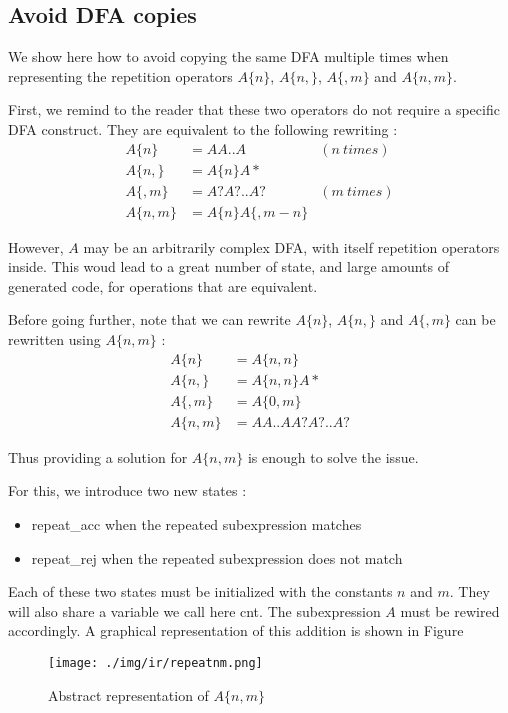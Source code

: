 \documentclass[11pt,a4paper]{report}
\newcommand{\regexp}[1]{$#1$}
\newcommand{\haskell}[1]{\textsf{#1}}
\begin{document}
\subsection{Avoid DFA copies}

We show here how to avoid copying the same DFA multiple times when representing the repetition operators \regexp{A\{n\}}, \regexp{A\{n,\}}, \regexp{A\{,m\}} and \regexp{A\{n,m\}}.

First, we remind to the reader that these two operators do not require a specific DFA construct. They are equivalent to the following rewriting :
\begin{align*}
A\{n\} &= AA..A &(n\ times) \\
A\{n,\} &= A\{n\}A*  \\
A\{,m\} &= A?A?..A? &(m\ times) \\
A\{n,m\} &= A\{n\}A\{,m-n\}
\end{align*}

However, $A$ may be an arbitrarily complex DFA, with itself repetition operators inside. This woud lead to a great number of state, and large amounts of generated code, for operations that are equivalent.

Before going further, note that we can rewrite $A\{n\}$, $A\{n,\}$  and $A\{,m\}$ can be rewritten using $A\{n,m\}$ :
\begin{align*}
A\{n\} &= A\{n,n\} \\
A\{n,\} &= A\{n,n\}A* \\
A\{,m\} &= A\{0,m\} \\
A\{n,m\} &= AA..AA?A?..A?
\end{align*}

Thus providing a solution for \regexp{A\{n,m\}} is enough to solve the issue.

For this, we introduce two new states :
\begin{itemize}
\item \haskell{repeat\_acc} when the repeated subexpression matches
\item \haskell{repeat\_rej} when the repeated subexpression does not match
\end{itemize}

Each of these two states must be initialized with the constants $n$ and $m$. They will also share a variable we call here \haskell{cnt}. The subexpression $A$ must be rewired accordingly. A graphical representation of this addition is shown in Figure 

\begin{figure}[t]
	\centering
	\texttt{[image: ./img/ir/repeatnm.png]}
	\caption{Abstract representation of \regexp{A\{n,m\}}}
	\label{repeatnmir}
\end{figure}
\end{document}
